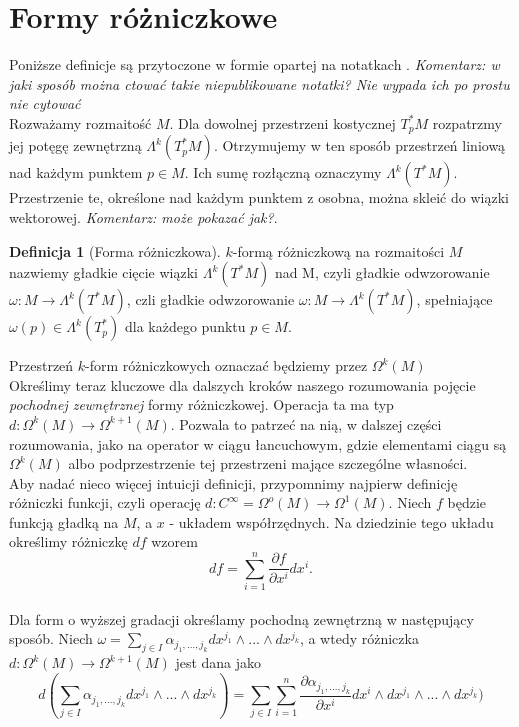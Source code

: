 \documentclass[licencjacka]{pracamgr}
\theoremstyle{definition}
\newtheorem{definition}{Definicja}[section]
\theoremstyle{definition}
\theoremstyle{plain}
\theoremstyle{plain}
\begin{document}
\section{Formy różniczkowe}
Poniższe definicje są przytoczone w formie opartej na notatkach
\cite{duszenko}. 
\emph{Komentarz: w jaki sposób można ctować takie niepublikowane notatki? Nie 
wypada ich po prostu nie cytować}
\\

Rozważamy rozmaitość $M$. Dla dowolnej przestrzeni kostycznej 
$T_p^\ast M$ rozpatrzmy jej potęgę zewnętrzną $\Lambda^k(T_p^\ast M)$.
Otrzymujemy w ten sposób przestrzeń liniową nad każdym punktem $p \in M$.
Ich sumę rozłączną oznaczymy $\Lambda^k(T^\ast M)$. Przestrzenie te,
określone nad każdym punktem z osobna, można skleić do wiązki wektorowej.
\emph{Komentarz: może pokazać jak?}. \\

\begin{definition}[Forma różniczkowa]
  $k$-formą różniczkową na rozmaitości $M$ nazwiemy gładkie cięcie
  wiązki $\Lambda^k(T^\ast M)$ nad M, czyli gładkie odwzorowanie
  $\omega: M \rightarrow \Lambda^k (T^\ast M)$, czli gładkie
  odwzorowanie $\omega: M \rightarrow \Lambda^k(T^\ast M)$, spełniające
  $\omega(p) \in \Lambda^k(T_p^\ast)$ dla każdego punktu $p \in M$.
\end{definition}

Przestrzeń $k$-form różniczkowych oznaczać będziemy przez $\Omega^k(M)$ \\

Określimy teraz kluczowe dla dalszych kroków naszego rozumowania pojęcie
\emph{pochodnej zewnętrznej} formy różniczkowej. Operacja ta ma typ $d:
\Omega^k(M) \rightarrow \Omega^{k+1} (M)$. Pozwala to patrzeć na nią, w dalszej
części rozumowania, jako na operator w ciągu łancuchowym, gdzie elementami
ciągu są $\Omega^k(M)$ albo podprzestrzenie tej przestrzeni mające szczególne
własności. \\

Aby nadać nieco więcej intuicji definicji, przypomnimy najpierw
definicję różniczki funkcji, czyli operację 
$d: C^\infty = \Omega^o(M) \rightarrow \Omega^1(M)$. Niech $f$ będzie funkcją
gładką na $M$, a $x$ -  układem współrzędnych. Na dziedzinie tego układu
określimy różniczkę $df$ wzorem
\[
df = \sum_{i=1}^n \frac{\partial f}{\partial x^i} dx^i.
\] \\

Dla form o wyższej gradacji określamy pochodną zewnętrzną w następujący
sposób. Niech 
$\omega = \sum_{j \in I} \alpha_{j_1, ..., j_k} dx^{j_1} \wedge ... \wedge dx^{j_k}$,
a wtedy różniczka $d: \Omega^k(M) \rightarrow \Omega^{k+1}(M)$ jest dana jako
\[ %
d( \sum_{j \in I} \alpha_{j_1, ..., j_k} dx^{j_1} \wedge ... \wedge dx^{j_k}) = 
 \sum_{j \in I} \sum_{i=1}^n
 \frac{ \partial \alpha_{j_1, ..., j_k}} {\partial x^i} dx^i
                            \wedge dx^{j_1} \wedge ... \wedge dx^{j_k})
\]
\end{document}
